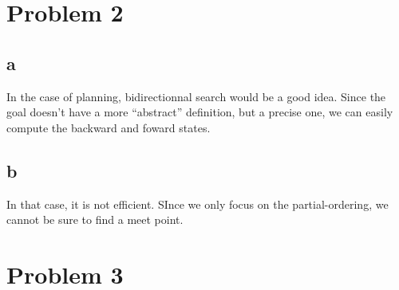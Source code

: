 \documentclass{article}
\begin{document}
    \section{Problem 2}
        \subsection{a}
            In the case of planning, bidirectionnal search would be a good idea. Since the goal doesn't have a more ``abstract'' definition, but a precise one, we can easily compute the backward and foward states.
        \subsection{b}
            In that case, it is not efficient. SInce we only focus on the partial-ordering, we cannot be sure to find a meet point.
    \section{Problem 3}
\end{document}
